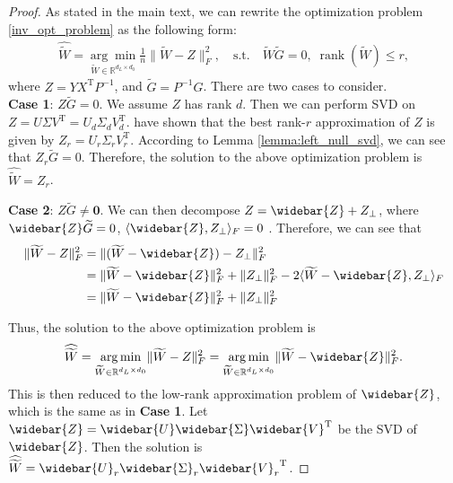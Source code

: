 \documentclass{article}
\newcommand{\T}{\mathrm{T}}
\theoremstyle{plain}
\theoremstyle{definition}
\theoremstyle{remark}
\theoremstyle{remark}
\begin{document}
  \globaloptimainv*
  \begin{proof}
    As stated in the main text, we can rewrite the optimization problem \ref{inv_opt_problem} as the following form:
    \begin{align}
      \widehat{\widetilde{W}} = \underset{\widetilde{W} \in \mathbb{R}^{d_L \times d_0}}{\arg \min} \frac{1}{n} \|\widetilde{W} - Z\|_F^2, \quad \text{s.t.} \quad \widetilde{W} \widetilde{G} = 0, \; \operatorname*{rank}(\widetilde{W}) \leq r,
    \end{align}
    where $Z = Y X^{\T} P^{-1}$, and $\widetilde{G} = P^{-1} G$. There are two cases to consider. \\
    \textbf{Case 1}: $Z\widetilde{G} = 0$. We assume $Z$ has rank $d$. Then we can perform SVD on $Z = U \Sigma V^{\T} = U_d \Sigma_d V_d^{\T}$. \citet{eckart1936} have shown that the best rank-$r$ approximation of $Z$ is given by $Z_r = U_r \Sigma_r V_r^{\T}$. According to Lemma \autoref{lemma:left_null_svd}, we can see that $Z_r \widetilde{G} = 0$. Therefore, the solution to the above optimization problem is $\widehat{\widetilde{W}} = Z_r$.
        
    \textbf{Case 2}: $Z\widetilde{G} \neq \mathbf{0}$. We can then decompose $Z = \widebar{Z} + Z_{\perp}$, where $\widebar{Z} \widetilde{G} = 0$, $\langle \widebar{Z}, Z_{\perp} \rangle_F = 0$ . Therefore, we can see that 
    \begin{align}
      \|\widetilde{W} - Z\|_F^2 &= \|(\widetilde{W} - \widebar{Z}) - Z_{\perp}\|_F^2 \nonumber \\
      &= \|\widetilde{W} - \widebar{Z}\|_F^2 + \|Z_{\perp}\|_F^2 - 2\langle \widetilde{W} - \widebar{Z}, Z_{\perp} \rangle_F \nonumber \\
      &= \|\widetilde{W} - \widebar{Z}\|_F^2 + \|Z_{\perp}\|_F^2
    \end{align}
        
    Thus, the solution to the above optimization problem is $$\widehat{\widetilde{W}} = \underset{\widetilde{W} \in \mathbb{R}^{d_L \times d_0}}{\arg\min} \| \widetilde{W}-Z\|_F^2 = \underset{\widetilde{W} \in \mathbb{R}^{d_L \times d_0}}{\arg\min} \|\widetilde{W}-\widebar{Z}\|_F^2.$$ 
    This is then reduced to the low-rank approximation problem of $\widebar{Z}$, which is the same as in \textbf{Case 1}. Let $\widebar{Z} = \widebar{U} \widebar{\Sigma} \widebar{V}^{\T}$ be the SVD of $\widebar{Z}$. Then the solution is $\widehat{\widetilde{W}} = \widebar{U}_r \widebar{\Sigma}_r {\widebar{V}_r}^{\T}$.
        

\end{proof}
\end{document}
